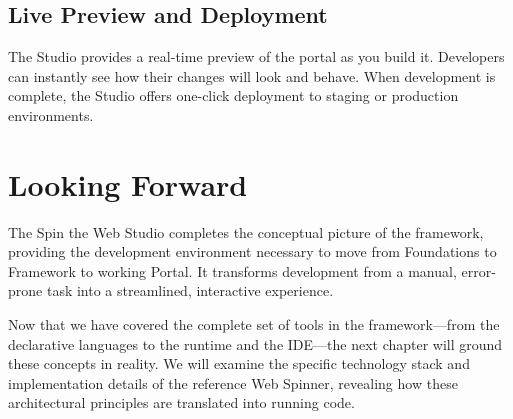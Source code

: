 \subsection{Live Preview and Deployment}
The Studio provides a real-time preview of the portal as you build it. Developers can instantly see how their changes will look and behave. When development is complete, the Studio offers one-click deployment to staging or production environments.

\section{Looking Forward}
\label{sec:studio-forward}

The Spin the Web Studio completes the conceptual picture of the framework, providing the development environment necessary to move from Foundations to Framework to working Portal. It transforms \webbase{} development from a manual, error-prone task into a streamlined, interactive experience.

Now that we have covered the complete set of tools in the framework—from the declarative languages to the runtime and the IDE—the next chapter will ground these concepts in reality. We will examine the specific technology stack and implementation details of the reference Web Spinner, revealing how these architectural principles are translated into running code.
